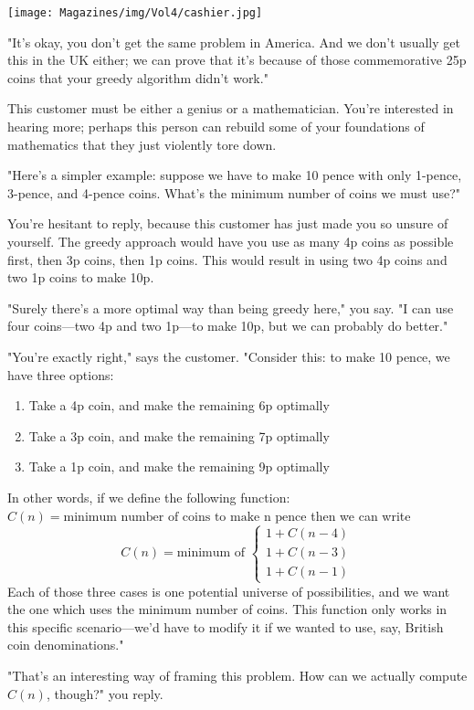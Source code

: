 \documentclass{article}
\begin{document}
\begin{center}
\texttt{[image: Magazines/img/Vol4/cashier.jpg]}
\end{center}

"It's okay, you don't get the same problem in America. And we don't usually get this in the UK either; we can prove that it's because of those commemorative 25p coins that your greedy algorithm didn't work."

This customer must be either a genius or a mathematician. You're interested in hearing more; perhaps this person can rebuild some of your foundations of mathematics that they just violently tore down.

"Here's a simpler example: suppose we have to make 10 pence with only 1-pence, 3-pence, and 4-pence coins. What's the minimum number of coins we must use?"

You're hesitant to reply, because this customer has just made you so unsure of yourself. The greedy approach would have you use as many 4p coins as possible first, then 3p coins, then 1p coins. This would result in using two 4p coins and two 1p coins to make 10p.

"Surely there's a more optimal way than being greedy here," you say. "I can use four coins—two 4p and two 1p—to make 10p, but we can probably do better."

"You're exactly right," says the customer. "Consider this: to make 10 pence, we have three options:
\begin{enumerate}
\item Take a 4p coin, and make the remaining 6p optimally
\item Take a 3p coin, and make the remaining 7p optimally
\item Take a 1p coin, and make the remaining 9p optimally
\end{enumerate}
In other words, if we define the following function:
$C(n) = \text{minimum number of coins to make n pence}$
then we can write
\[
C(n) = \text{minimum of }
\begin{cases}
    1 + C(n - 4) \\
    1 + C(n - 3) \\
    1 + C(n - 1)
\end{cases}
\]
Each of those three cases is one potential universe of possibilities, and we want the one which uses the minimum number of coins. This function only works in this specific scenario—we'd have to modify it if we wanted to use, say, British coin denominations."

"That's an interesting way of framing this problem. How can we actually compute $C(n)$, though?" you reply.
\end{document}
